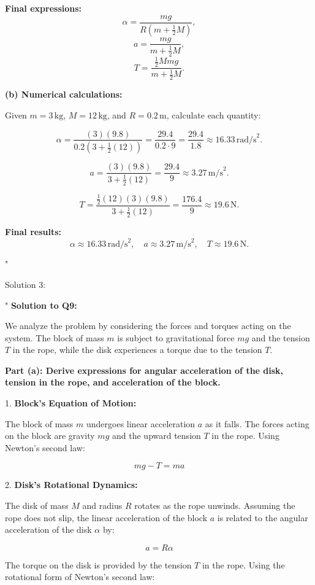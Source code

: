 \textbf{Final expressions:}
\[
\alpha = \frac{mg}{R \left(m + \frac{1}{2} M\right)},
\]
\[
a = \frac{mg}{m + \frac{1}{2} M},
\]
\[
T = \frac{\frac{1}{2} M m g}{m + \frac{1}{2} M}.
\]

\textbf{(b) Numerical calculations:}

Given $m = 3 \, \text{kg}$, $M = 12 \, \text{kg}$, and $R = 0.2 \, \text{m}$, calculate each quantity:

\[
\alpha = \frac{(3)(9.8)}{0.2 \left(3 + \frac{1}{2} (12)\right)} = \frac{29.4}{0.2 \cdot 9} = \frac{29.4}{1.8} \approx 16.33 \, \text{rad/s}^2.
\]

\[
a = \frac{(3)(9.8)}{3 + \frac{1}{2} (12)} = \frac{29.4}{9} \approx 3.27 \, \text{m/s}^2.
\]

\[
T = \frac{\frac{1}{2} (12)(3)(9.8)}{3 + \frac{1}{2} (12)} = \frac{176.4}{9} \approx 19.6 \, \text{N}.
\]

\textbf{Final results:}
\[
\alpha \approx 16.33 \, \text{rad/s}^2, \quad a \approx 3.27 \, \text{m/s}^2, \quad T \approx 19.6 \, \text{N}.
\]

"

Solution 3:

"
\textbf{Solution to Q9:}

We analyze the problem by considering the forces and torques acting on the system. The block of mass $m$ is subject to gravitational force $mg$ and the tension $T$ in the rope, while the disk experiences a torque due to the tension $T$.

\textbf{Part (a): Derive expressions for angular acceleration of the disk, tension in the rope, and acceleration of the block.}

1. \textbf{Block's Equation of Motion:}

The block of mass $m$ undergoes linear acceleration $a$ as it falls. The forces acting on the block are gravity $mg$ and the upward tension $T$ in the rope. Using Newton's second law:

\[
mg - T = ma \tag{1}
\]

2. \textbf{Disk's Rotational Dynamics:}

The disk of mass $M$ and radius $R$ rotates as the rope unwinds. Assuming the rope does not slip, the linear acceleration of the block $a$ is related to the angular acceleration of the disk $\alpha$ by:

\[
a = R\alpha \tag{2}
\]

The torque on the disk is provided by the tension $T$ in the rope. Using the rotational form of Newton's second law:

